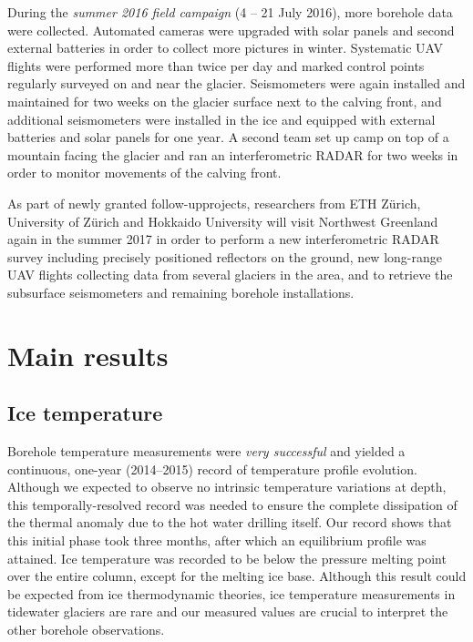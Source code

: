 \documentclass{article}
\begin{document}
During the \emph{summer 2016 field campaign} (4 -- 21 July 2016), more borehole
data were collected. Automated cameras were upgraded with solar panels and
second external batteries in order to collect more pictures in winter.
Systematic UAV flights were performed more than twice per day and marked
control points regularly surveyed on and near the glacier. Seismometers were
again installed and maintained for two weeks on the glacier surface next to the
calving front, and additional seismometers were installed in the ice and
equipped with external batteries and solar panels for one year. A second team
set up camp on top of a mountain facing the glacier and ran an interferometric
RADAR for two weeks in order to monitor movements of the calving front.

As part of newly granted follow-upprojects, researchers from ETH Zürich,
University of Zürich and Hokkaido University will visit Northwest Greenland
again in the summer 2017 in order to perform a new interferometric RADAR survey
including precisely positioned reflectors on the ground, new long-range UAV
flights collecting data from several glaciers in the area, and to retrieve the
subsurface seismometers and remaining borehole installations.


\section{Main results}

\subsection{Ice temperature}

Borehole temperature measurements were \emph{very successful} and yielded a
continuous, one-year (2014--2015) record of temperature profile evolution.
Although we expected to observe no intrinsic temperature variations at depth,
this temporally-resolved record was needed to ensure the complete dissipation
of the thermal anomaly due to the hot water drilling itself. Our record shows
that this initial phase took three months, after which an equilibrium profile
was attained. Ice temperature was recorded to be below the pressure melting
point over the entire column, except for the melting ice base. Although this
result could be expected from ice thermodynamic theories, ice temperature
measurements in tidewater glaciers are rare and our measured values are crucial
to interpret the other borehole observations.
\end{document}

